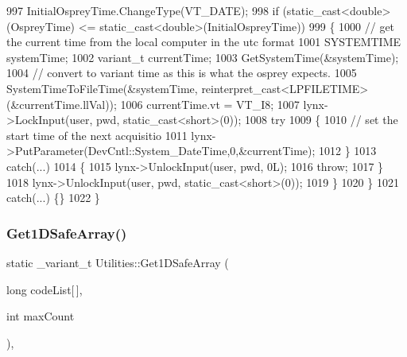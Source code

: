 \begin{DoxyCode}
997             InitialOspreyTime.ChangeType(VT\_DATE);
998             \textcolor{keywordflow}{if} (static\_cast<double>(OspreyTime) <= static\_cast<double>(InitialOspreyTime))
999             \{
1000                 \textcolor{comment}{// get the current time from the local computer in the utc format}
1001                 SYSTEMTIME systemTime;
1002                 variant\_t currentTime;
1003                 GetSystemTime(&systemTime);
1004                 \textcolor{comment}{// convert to variant time as this is what the osprey expects.}
1005                 SystemTimeToFileTime(&systemTime, reinterpret\_cast<LPFILETIME>(&currentTime.llVal));
1006                 currentTime.vt = VT\_I8;
1007                 lynx->LockInput(user, pwd, static\_cast<short>(0));
1008                 \textcolor{keywordflow}{try}
1009                 \{
1010                     \textcolor{comment}{// set the start time of the next acquisitio}
1011                     lynx->PutParameter(DevCntl::System\_DateTime,0,&currentTime);
1012                 \}
1013                 \textcolor{keywordflow}{catch}(...) 
1014                 \{
1015                     lynx->UnlockInput(user, pwd, 0L);
1016                     \textcolor{keywordflow}{throw};
1017                 \}
1018                 lynx->UnlockInput(user, pwd, static\_cast<short>(0));
1019             \}
1020         \}
1021         \textcolor{keywordflow}{catch}(...) \{\}
1022     \}
\end{DoxyCode}
\mbox{\label{class_utilities_a647591ab58d508945d0dc80db2101624_a647591ab58d508945d0dc80db2101624}} 
\subsubsection{\texorpdfstring{Get1\+D\+Safe\+Array()}{Get1DSafeArray()}\hspace{0.1cm}{\footnotesize\ttfamily [1/2]}}
{\footnotesize\ttfamily static \+\_\+variant\+\_\+t Utilities\+::\+Get1\+D\+Safe\+Array (\begin{DoxyParamCaption}\item[{long}]{code\+List\mbox{[}$\,$\mbox{]},  }\item[{int}]{max\+Count }\end{DoxyParamCaption})\hspace{0.3cm}{\ttfamily [inline]}, {\ttfamily [static]}}

